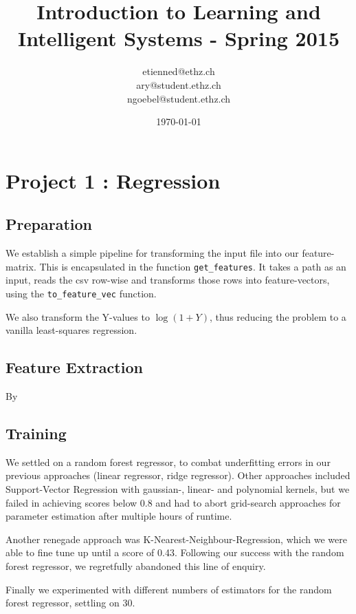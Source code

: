 \documentclass[a4paper, 11pt]{article}
\title{Introduction to Learning and Intelligent Systems - Spring 2015}
\author{etienned@ethz.ch\\ ary@student.ethz.ch\\ ngoebel@student.ethz.ch\\}
\date{\today}
\begin{document}
\maketitle

\section*{Project 1 : Regression}

\subsection*{Preparation}

We establish a simple pipeline for transforming the input file into our feature-matrix.
This is encapsulated in the function \texttt{get\_features}.
It takes a path as an input, reads the csv row-wise and
transforms those rows into feature-vectors, using the \texttt{to\_feature\_vec} function.

We also transform the Y-values to $\log(1 + Y)$, thus reducing the problem
to a vanilla least-squares regression.

\subsection*{Feature Extraction}

By

\subsection*{Training}

We settled on a random forest regressor, to combat underfitting errors in
our previous approaches (linear regressor, ridge regressor). Other approaches
included Support-Vector Regression with gaussian-, linear- and polynomial kernels,
but we failed in achieving scores below 0.8 and had to abort grid-search approaches
for parameter estimation after multiple hours of runtime.

Another renegade approach was K-Nearest-Neighbour-Regression, which we were able
to fine tune up until a score of 0.43. Following our success with the random forest regressor, we regretfully
abandoned this line of enquiry.

Finally we experimented with different numbers of estimators for the random forest regressor,
settling on 30.
\end{document}
